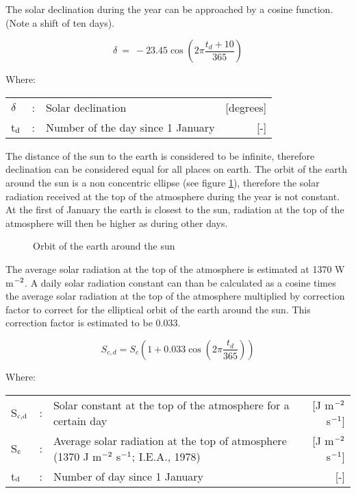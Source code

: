 \documentclass[11pt]{report}
\newcommand{\FigDir}{.}
\begin{document}
The solar {\nobreak}declination during the year can be approached by a cosine function. (Note a shift of ten days).

\begin{equation}
\delta ~=~ -23.45 \cos ( 2 \pi {\frac{t _{d} + 10}{365}} )
\end{equation}

Where:\\
\begin{tabularx}{\textwidth}{llXr}
$\delta$ &:& Solar declination   & [de\-grees]\\
t$_{{\rm d}}$ &:& Number of the day since 1 January   & [-]\\
\end{tabularx}

The distance of the sun to the earth is considered to be infinite, therefore declination can be considered equal for all places on earth. The orbit of the earth around the sun is a non concentric ellipse (see figure \ref{fig:orbit}), therefore the solar radiation received at the top of the atmosphere during the year is not constant. At the first of January the earth is closest to the sun, radiation at the top of the atmosphere will then be higher as during other days. \\

\begin{figure}[htbp]
\caption{Orbit of the earth around the sun}
\label{fig:orbit}
\begin{forcewidth}{7.77cm}
 \begin{center}\InputPS{\FigDir/ELIPS.eps} \end{center}
\end{forcewidth}
\end{figure}

The average solar radiation at the top of the atmosphere is estimated at 1370 W m$^{\rm -2}$. A daily solar radiation constant can than be calculated as a cosine times the average solar radiation at the top of the atmosphere multiplied by correction factor to correct for the elliptical orbit of the earth around the sun. This correction factor is estimated to be 0.033.

\begin{equation}
\label{eq:SolarConst}
S _{c,d} = S _{c} (1+0.033 \cos (2 \pi {\frac{t _{d} }{365}} ))
\end{equation}

Where:\\
\begin{tabularx}{\textwidth}{llXr}
S$_{{\rm c,d}}$ &:& Solar constant at the top of the atmosphere for a certain day  & [J m$^{{\rm -2}}$ s$^{{\rm -1}}$]\\
S$_{{\rm c}}$ &:& Average solar radiation at the top of atmosphere (1370 J m$^{{\rm -2}}$ s$^{{\rm -1}}$; I.E.A., 1978) & [J m$^{{\rm -2}}$ s$^{{\rm -1}}$]\\
t$_{{\rm d}}$ &:& Number of day since 1 January  & [-]\\
\end{tabularx}
\end{document}
